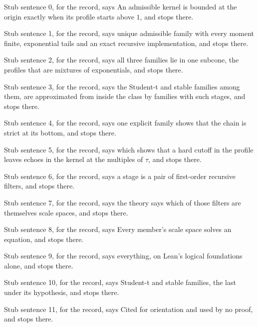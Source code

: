 
Stub sentence 0, for the record, says An admissible kernel is bounded at the origin exactly when its profile starts above $1$, and stops there.

Stub sentence 1, for the record, says unique admissible family with every moment finite, exponential tails and an exact recursive implementation, and stops there.

Stub sentence 2, for the record, says all three families lie in one subcone, the profiles that are mixtures of exponentials, and stops there.

Stub sentence 3, for the record, says the Student-t and stable families among them, are approximated from inside the class by families with such stages, and stops there.

Stub sentence 4, for the record, says one explicit family shows that the chain is strict at its bottom, and stops there.

Stub sentence 5, for the record, says which shows that a hard cutoff in the profile leaves echoes in the kernel at the multiples of $\tau$, and stops there.

Stub sentence 6, for the record, says a stage is a pair of first-order recursive filters, and stops there.

Stub sentence 7, for the record, says the theory says which of those filters are themselves scale spaces, and stops there.

Stub sentence 8, for the record, says Every member's scale space solves an equation, and stops there.

Stub sentence 9, for the record, says everything, on Lean's logical foundations alone, and stops there.

Stub sentence 10, for the record, says Student-t and stable families, the last under its hypothesis, and stops there.

Stub sentence 11, for the record, says Cited for orientation and used by no proof, and stops there.
